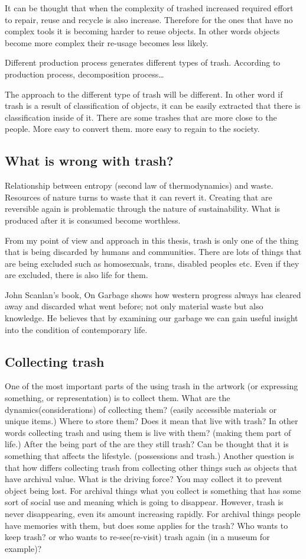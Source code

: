 It can be thought that when the complexity of trashed increased required effort to repair, reuse and recycle is also increase. Therefore for the ones that have no complex tools it is becoming harder to reuse objects. In other words objects become more complex their re-usage becomes less likely. 

Different production process generates different types of trash. According to production process, decomposition process\ldots

The approach to the different type of trash will be different. In other word if trash is a result of classification of objects, it can be easily extracted that there is classification inside of it. There are some trashes that are more close to the people. More easy to convert them. more easy to regain to the society.  

\subsection{What is wrong with trash?}
Relationship between entropy (second law of thermodynamics) and waste. Resources of nature turns to waste that it can revert it. Creating that are reversible again is problematic through the nature of sustainability. What is produced after it is consumed become worthless. 

From my point of view and approach in this thesis, trash is only one of the thing that is being discarded by humans and communities. There are lots of things that are being excluded such as homosexuals, trans, disabled peoples etc. Even if they are excluded, there is also life for them. 

John Scanlan's book, On Garbage shows how western progress always has cleared away and discarded what went before; not only material waste but also knowledge. He believes that by examining our garbage we can gain useful insight into the condition of contemporary life.

\subsection{Collecting trash}
One of the most important parts of the using trash in the artwork (or expressing something, or representation) is to collect them. What are the dynamics(considerations) of collecting them? (easily accessible materials or unique items.) Where to store them? Does it mean that live with trash? In other words collecting trash and using them is live with them? (making them part of life.) After the being part of the are they still trash? Can be thought that it is something that affects the lifestyle. (possessions and trash.) Another question is that how differs collecting trash from collecting other things such as objects that have archival value. What is the driving force? You may collect it to prevent object being lost. For archival things what you collect is something that has some sort of social use and meaning which is going to disappear. However, trash is never disappearing, even its amount increasing rapidly. For archival things people have memories with them, but does some applies for the trash? Who wants to keep trash? or who wants to re-see(re-visit) trash again (in a museum for example)?


